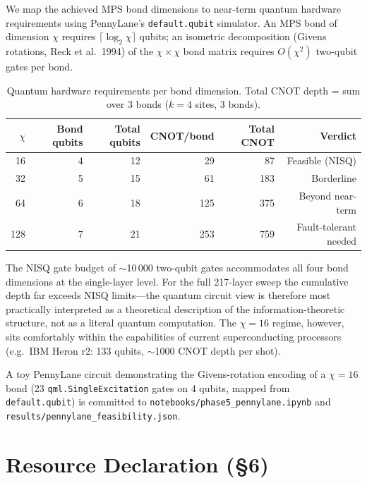 \documentclass[10pt,twocolumn]{article}
\begin{document}
We map the achieved MPS bond dimensions to near-term quantum hardware requirements
using PennyLane's \texttt{default.qubit} simulator. An MPS bond of dimension $\chi$
requires $\lceil \log_2 \chi \rceil$ qubits; an isometric decomposition
(Givens rotations, Reck et al.~1994) of the $\chi \times \chi$ bond matrix requires
$O(\chi^2)$ two-qubit gates per bond.

\begin{table}[h]
\centering
\small
\caption{Quantum hardware requirements per bond dimension.
  Total CNOT depth = sum over 3 bonds ($k=4$ sites, 3 bonds).}
\label{tab:quantum}
\begin{tabular}{rrrrrr}
\toprule
$\chi$ & Bond qubits & Total qubits & CNOT/bond & Total CNOT & Verdict \\
\midrule
16  & 4 & 12 & 29  & 87  & Feasible (NISQ) \\
32  & 5 & 15 & 61  & 183 & Borderline \\
64  & 6 & 18 & 125 & 375 & Beyond near-term \\
128 & 7 & 21 & 253 & 759 & Fault-tolerant needed \\
\bottomrule
\end{tabular}
\end{table}

The NISQ gate budget of $\sim$10\,000 two-qubit gates accommodates all four bond
dimensions at the single-layer level. For the full 217-layer sweep the cumulative
depth far exceeds NISQ limits---the quantum circuit view is therefore most
practically interpreted as a theoretical description of the information-theoretic
structure, not as a literal quantum computation. The $\chi=16$ regime, however,
sits comfortably within the capabilities of current superconducting processors
(e.g.\ IBM Heron r2: 133 qubits, $\sim$1000 CNOT depth per shot).

A toy PennyLane circuit demonstrating the Givens-rotation encoding of a $\chi=16$
bond (23 \texttt{qml.SingleExcitation} gates on 4 qubits, mapped from
\texttt{default.qubit}) is committed to
\texttt{notebooks/phase5\_pennylane.ipynb} and
\texttt{results/pennylane\_feasibility.json}.

\section{Resource Declaration (\S6)}
\label{app:resources}
\end{document}

